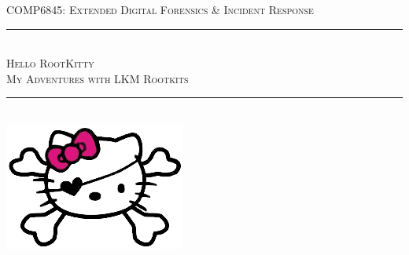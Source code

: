 \documentclass[11pt]{article}
\newcommand{\HRule}{\rule{\linewidth}{0.2mm}}               %
\begin{document}
\pagecolor{HelloKittyPink!30}
\begin{titlepage}
\center

\textsc{\LARGE COMP6845: Extended Digital Forensics \& Incident Response}\\[1.5cm]         %


\HRule \\[0.4cm]
\textsc{\Large Hello RootKitty}\\[0.5cm]   %
\textsc{\large My Adventures with LKM Rootkits}\\[0.5cm]  %
\HRule \\[2.5cm]    


\includegraphics[scale=1]{logo.png}            %



\end{titlepage}
\end{document}

